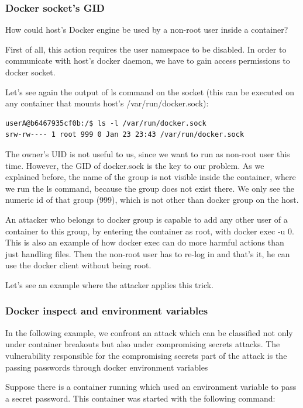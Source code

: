 \subsubsection{Docker socket's GID}
How could host's Docker engine be used by a non-root user inside a container?

First of all, this action requires the user namespace to be disabled. In order to communicate with host's docker daemon, we have to gain access permissions to docker socket.

Let's see again the output of ls command on the socket (this can be executed on any container that mounts host's /var/run/docker.sock):

\begin{lstlisting}[style=terminal]
userA@b6467935cf0b:/$ ls -l /var/run/docker.sock
srw-rw---- 1 root 999 0 Jan 23 23:43 /var/run/docker.sock
\end{lstlisting}

The owner's UID is not useful to us, since we want to run as non-root user this time.
However, the GID of docker.sock is the key to our problem. As we explained before, the name of the group is not visible inside the container, where we run the ls command, because the group does not exist there. We only see the numeric id of that group (999), which is not other than docker group on the host.

An attacker who belongs to docker group is capable to add any other user of a container to this group, by entering the container as root, with docker exec -u 0. This is also an example of how docker exec can do more harmful actions than just handling files. 
Then the non-root user has to re-log in and that's it, he can use the docker client without being root.

Let's see an example where the attacker applies this trick.
\subsubsection{Docker inspect and environment variables}
In the following example, we confront an attack which can be classified not only under container breakouts but also under compromising secrets attacks. The vulnerability responsible for the compromising secrets part of the attack is the passing passwords through docker environment variables

Suppose there is a container running which used an environment variable to pass a secret password. This container was started with the following command:

